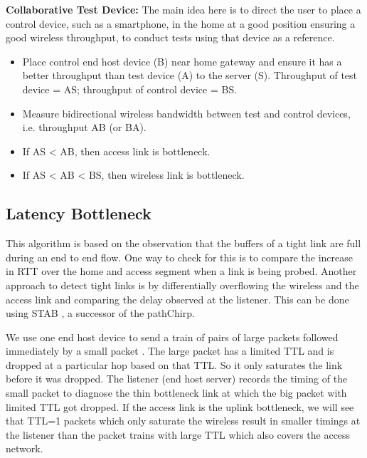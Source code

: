 \textbf{Collaborative Test Device:} The main idea here is to direct the user to place a control device, such as a smartphone, in the home at a good position ensuring a good wireless throughput, to conduct tests using that device as a reference. %
\begin{itemize}[noitemsep,topsep=0pt,parsep=0pt,partopsep=0pt]
\item Place control end host device (B) near home gateway and ensure it has a better throughput than test device (A) to the server (S). Throughput of test device = AS; throughput of control device = BS.
\item Measure bidirectional wireless bandwidth between test and control devices, i.e. throughput AB (or BA).
\item If AS < AB, then access link is bottleneck.%
\item If AS < AB < BS, then wireless link is bottleneck.%
\end{itemize}


\subsection{Latency Bottleneck}
\label{latency}

This algorithm is based on the observation that the buffers of a tight link are full during an end to end flow. One way to check for this is to compare the increase in RTT over the home and access segment when a link is being probed. Another approach to detect tight links is by differentially overflowing the wireless and the access link and comparing the delay observed at the listener. This can be done using STAB \cite{stab}, a successor of the pathChirp.

We use one end host device to send a train of pairs of large packets followed immediately by a small packet . The large packet has a limited TTL and is dropped at a particular hop based on that TTL. So it only saturates the link before it was dropped. The listener (end host server) records the timing of the small packet to diagnose the thin bottleneck link at which the big packet with limited TTL got dropped. If the access link is the uplink bottleneck, we will see that TTL=1 packets which only saturate the wireless result in smaller timings at the listener than the packet trains with large TTL which also covers the access network.